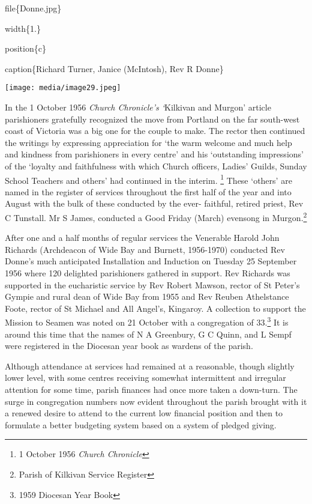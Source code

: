 file\{Donne.jpg\}

width\{1.\}

position\{c\}

caption\{Richard Turner, Janice (McIntosh), Rev R Donne\}

\texttt{[image: media/image29.jpeg]}

In the 1 October 1956 \emph{Church Chronicle's `}Kilkivan and Murgon' article parishioners gratefully recognized the move from Portland on the far south-west coast of Victoria was a big one for the couple to make. The rector then continued the writings by expressing appreciation for `the warm welcome and much help and kindness from parishioners in every centre' and his `outstanding impressions' of the `loyalty and faithfulness with which Church officers, Ladies' Guilds, Sunday School Teachers and others' had continued in the interim. \footnote{1 October 1956 \emph{Church Chronicle}} These `others' are named in the register of services throughout the first half of the year and into August with the bulk of these conducted by the ever- faithful, retired priest, Rev C Tunstall. Mr S James, conducted a Good Friday (March) evensong in Murgon.\footnote{Parish of Kilkivan Service Register}

After one and a half months of regular services the Venerable Harold John Richards (Archdeacon of Wide Bay and Burnett, 1956-1970) conducted Rev Donne's much anticipated Installation and Induction on Tuesday 25 September 1956 where 120 delighted parishioners gathered in support. Rev Richards was supported in the eucharistic service by Rev Robert Mawson, rector of St Peter's Gympie and rural dean of Wide Bay from 1955 and Rev Reuben Athelstance Foote, rector of St Michael and All Angel's, Kingaroy. A collection to support the Mission to Seamen was noted on 21 October with a congregation of 33.\footnote{1959 Diocesan Year Book} It is around this time that the names of N A Greenbury, G C Quinn, and L Sempf were registered in the Diocesan year book as wardens of the parish.

Although attendance at services had remained at a reasonable, though slightly lower level, with some centres receiving somewhat intermittent and irregular attention for some time, parish finances had once more taken a down-turn. The surge in congregation numbers now evident throughout the parish brought with it a renewed desire to attend to the current low financial position and then to formulate a better budgeting system based on a system of pledged giving.

